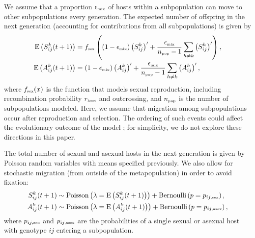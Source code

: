 \documentclass{article}\usepackage[]{graphicx}\usepackage[]{color}
\begin{document}
We assume that a proportion $\epsilon_{\textrm{\tiny mix}}$ of hosts within a subpopulation can move to other subpopulations every generation. 
The expected number of offspring in the next generation (accounting for contributions from all subpopulations) is given by
\begin{equation}
\begin{aligned}
\mathrm{E}\left(S_{ij}^k(t+1)\right) &= f_{\textrm{\tiny sex}}\left((1 - \epsilon_{\textrm{\tiny mix}}) \left(S_{ij}^k\right)' + \frac{\epsilon_{\textrm{\tiny mix}}}{n_{\textrm{\tiny pop}}-1} \sum_{h \neq k} \left(S_{ij}^h\right)'\right),\\
\mathrm{E}\left(A_{ij}^k(t+1)\right) &= (1 - \epsilon_{\textrm{\tiny mix}}) \left(A_{ij}^k\right)' + \frac{\epsilon_{\textrm{\tiny mix}}}{n_{\textrm{\tiny pop}}-1} \sum_{h \neq k} \left(A_{ij}^h\right)',\\
\end{aligned}
\end{equation}
where $f_{\textrm{\tiny sex}}(x)$ is the function that models sexual reproduction, including recombination probability $r_{\textrm{\tiny host}}$ and outcrossing, and $n_{\textrm{\tiny pop}}$ is the number of subpopulations modeled.
Here, we assume that migration among subpopulations occur after reproduction and selection. 
The ordering of such events could affect the evolutionary outcome of the model \citep{mani1989evolution, michalakis1996interaction, massol2015evolution};
for simplicity, we do not explore these directions in this paper.

The total number of sexual and asexual hosts in the next generation is given by Poisson random variables with means specified previously. We also allow for stochastic migration (from outside of the metapopulation) in order to avoid fixation:
\begin{equation}
\begin{aligned}
S_{ij}^k(t+1) &\sim \mathrm{Poisson}\left(\lambda=\mathrm{E}\left(S_{ij}^k(t+1)\right)\right) + \mathrm{Bernoulli}\left(p=p_{ij,\textrm{\tiny sex}}\right),\\
A_{ij}^k(t+1) &\sim \mathrm{Poisson}\left(\lambda=\mathrm{E}\left(A_{ij}^k(t+1)\right)\right) + \mathrm{Bernoulli}\left(p=p_{ij, \textrm{\tiny asex}}\right),
\end{aligned}
\end{equation}
where $p_{ij,\textrm{\tiny sex}}$ and $p_{ij, \textrm{\tiny asex}}$ are the probabilities of a single sexual or asexual host with genotype $ij$ entering a subpopulation.
\end{document}
